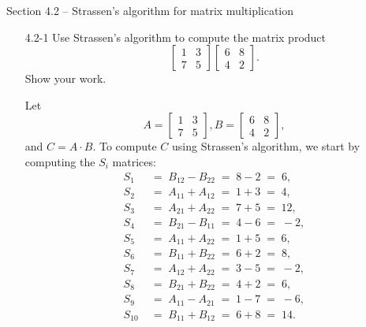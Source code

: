 \documentclass{report}
\makeatletter
\renewenvironment{framed}{%
 \def\FrameCommand##1{\hskip\@totalleftmargin
 \fboxsep=\FrameSep\fbox{##1}}%
 \MakeFramed {\advance\hsize-\width
   \@totalleftmargin\z@ \linewidth\hsize
   \@setminipage}}%
 {\par\unskip\endMakeFramed}
\makeatother
\begin{document}
\newpage

{\large Section 4.2 {--} Strassen's algorithm for matrix multiplication}

\begin{enumerate}

\item[4.2{-}1]{Use Strassen's algorithm to compute the matrix product
\[
\begin{bmatrix}
  1 & 3\\
  7 & 5
\end{bmatrix}
\begin{bmatrix}
  6 & 8\\
  4 & 2
\end{bmatrix}
.
\]
Show your work.
}

\begin{framed}
Let
\[
  A = \begin{bmatrix} 1 & 3\\ 7 & 5 \end{bmatrix},
  B = \begin{bmatrix} 6 & 8\\ 4 & 2 \end{bmatrix},
\]
and $C = A \cdot B$. To compute $C$ using Strassen's algorithm, we start by
computing the $S_i$ matrices:
\begin{equation*}
\begin{aligned}
S_1 \; &= \; B_{12} - B_{22} \; = \; 8 - 2 \; = \; 6,\\
S_2 \; &= \; A_{11} + A_{12} \; = \; 1 + 3 \; = \; 4,\\
S_3 \; &= \; A_{21} + A_{22} \; = \; 7 + 5 \; = \; 12,\\
S_4 \; &= \; B_{21} - B_{11} \; = \; 4 - 6 \; = \; -2,\\
S_5 \; &= \; A_{11} + A_{22} \; = \; 1 + 5 \; = \; 6,\\
S_6 \; &= \; B_{11} + B_{22} \; = \; 6 + 2 \; = \; 8,\\
S_7 \; &= \; A_{12} + A_{22} \; = \; 3 - 5 \; = \; -2,\\
S_8 \; &= \; B_{21} + B_{22} \; = \; 4 + 2 \; = \; 6,\\
S_9 \; &= \; A_{11} - A_{21} \; = \; 1 - 7 \; = \; -6,\\
S_{10} \; &= \; B_{11} + B_{12} \; = \; 6 + 8 \; = \; 14.
\end{aligned}
\end{equation*}


\end{framed}
\end{enumerate}
\end{document}
